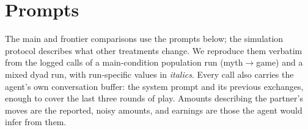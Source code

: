 \providecommand{\pv}[1]{\textrm{\textit{#1}}}
\newenvironment{promptbox}{\par\smallskip\begingroup\footnotesize\ttfamily\raggedright\setlength{\parindent}{0pt}\setlength{\parskip}{4pt}\leftskip=0.8em}{\par\endgroup\smallskip}
\newenvironment{promptboxcompact}{\par\smallskip\begingroup\scriptsize\ttfamily\raggedright\setlength{\parindent}{0pt}\setlength{\parskip}{2pt}\leftskip=0.8em}{\par\endgroup\smallskip}

\section{Prompts}
\label{sec:prompts}

The main and frontier comparisons use the prompts below; the simulation protocol describes what other treatments change. We reproduce them verbatim from the logged calls of a main-condition population run (myth$\rightarrow$game) and a mixed dyad run, with run-specific values in \textit{italics}. Every call also carries the agent's own conversation buffer: the system prompt and its previous exchanges, enough to cover the last three rounds of play. Amounts describing the partner's moves are the reported, noisy amounts, and earnings are those the agent would infer from them.

